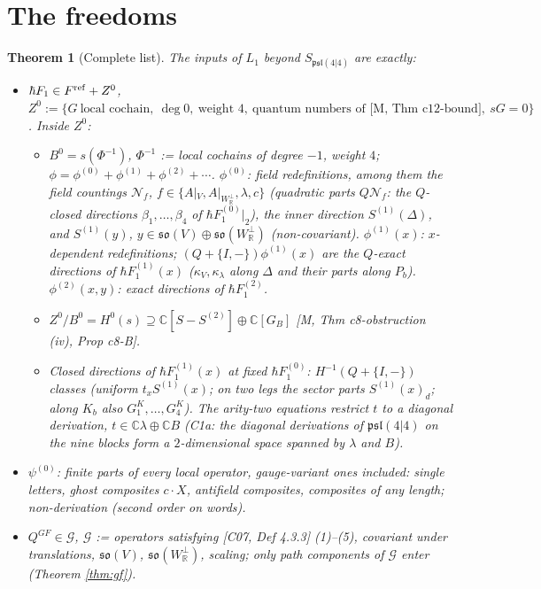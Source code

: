 \documentclass[10pt]{article}
\newtheorem{theorem}{Theorem}[section]
\theoremstyle{definition}
\newcommand{\pl}{\mathfrak{psl}(4|4)}
\newcommand{\Wp}{W_{\mathbb R}^\perp}
\begin{document}
\section{The freedoms}

\begin{theorem}[Complete list]\label{thm:list}
The inputs of $L_1$ beyond $S_{\pl}$ are exactly:
\begin{itemize}
\item[(a)] $\hbar F_1\in F^{\rm ref}+Z^0$, $Z^0:=\{G\ \text{local cochain},\ \deg0,\ \text{weight }4,\ \text{quantum numbers of [M, Thm c12-bound]},\ sG=0\}$. Inside $Z^0$:
\begin{itemize}
\item[(a1)] $B^0=s(\Phi^{-1})$, $\Phi^{-1}$ := local cochains of degree $-1$, weight $4$; $\phi=\phi^{(0)}+\phi^{(1)}+\phi^{(2)}+\cdots$. $\phi^{(0)}$: field redefinitions, among them the field countings $\mathcal N_f$, $f\in\{A|_V,A|_{\Wp},\lambda,c\}$ (quadratic parts $Q\mathcal N_f$: the $Q$-closed directions $\beta_1,\dots,\beta_4$ of $\hbar F_1^{(0)}|_2$), the inner direction $S^{(1)}(\Delta)$, and $S^{(1)}(y)$, $y\in\mathfrak{so}(V)\oplus\mathfrak{so}(\Wp)$ (non-covariant). $\phi^{(1)}(x)$: $x$-dependent redefinitions; $(Q+\{I,-\})\phi^{(1)}(x)$ are the $Q$-exact directions of $\hbar F_1^{(1)}(x)$ ($\kappa_V,\kappa_\lambda$ along $\Delta$ and their parts along $P_b$). $\phi^{(2)}(x,y)$: exact directions of $\hbar F_1^{(2)}$.
\item[(a2)] $Z^0/B^0=H^0(s)\supseteq\mathbb C[S-S^{(2)}]\oplus\mathbb C[G_B]$ [M, Thm c8-obstruction (iv), Prop c8-B].
\item[(a3)] Closed directions of $\hbar F_1^{(1)}(x)$ at fixed $\hbar F_1^{(0)}$: $H^{-1}(Q+\{I,-\})$ classes (uniform $t_xS^{(1)}(x)$; on two legs the sector parts $S^{(1)}(x)_d$; along $K_b$ also $G^K_1,\dots,G^K_4$). The arity-two equations restrict $t$ to a diagonal derivation, $t\in\mathbb C\lambda\oplus\mathbb C B$ (C1a: the diagonal derivations of $\pl$ on the nine blocks form a $2$-dimensional space spanned by $\lambda$ and $B$).
\end{itemize}
\item[(b)] $\psi^{(0)}$: finite parts of every local operator, gauge-variant ones included: single letters, ghost composites $c\cdot X$, antifield composites, composites of any length; non-derivation (second order on words).
\item[(c)] $Q^{GF}\in\mathcal G$, $\mathcal G$ := operators satisfying [C07, Def 4.3.3] (1)--(5), covariant under translations, $\mathfrak{so}(V)$, $\mathfrak{so}(\Wp)$, scaling; only path components of $\mathcal G$ enter (Theorem \ref{thm:gf}).

\end{itemize}
\end{theorem}
\end{document}
